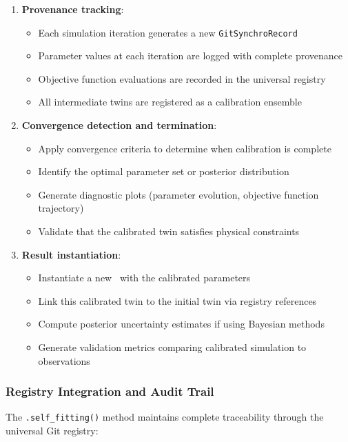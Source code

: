 \begin{enumerate}
\item \textbf{Provenance tracking}:
\begin{itemize}
    \item Each simulation iteration generates a new \texttt{GitSynchroRecord}
    \item Parameter values at each iteration are logged with complete provenance
    \item Objective function evaluations are recorded in the universal registry
    \item All intermediate twins are registered as a calibration ensemble
\end{itemize}

\item \textbf{Convergence detection and termination}:
\begin{itemize}
    \item Apply convergence criteria to determine when calibration is complete
    \item Identify the optimal parameter set or posterior distribution
    \item Generate diagnostic plots (parameter evolution, objective function trajectory)
    \item Validate that the calibrated twin satisfies physical constraints
\end{itemize}

\item \textbf{Result instantiation}:
\begin{itemize}
    \item Instantiate a new \hydrot\ with the calibrated parameters
    \item Link this calibrated twin to the initial twin via registry references
    \item Compute posterior uncertainty estimates if using Bayesian methods
    \item Generate validation metrics comparing calibrated simulation to observations
\end{itemize}
\end{enumerate}

\subsubsection{Registry Integration and Audit Trail}

The \texttt{.self\_fitting()} method maintains complete traceability through the universal Git registry:

